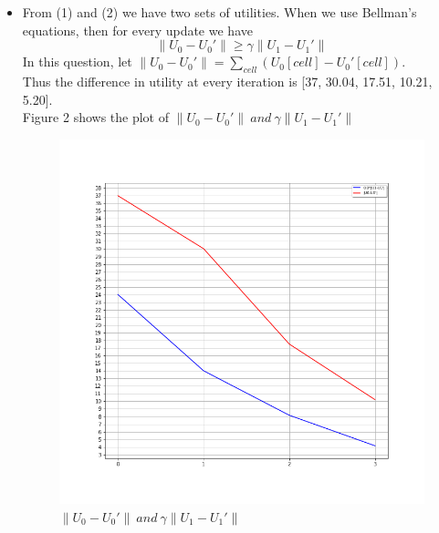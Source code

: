 \documentclass[letter, 10pt]{article}
\begin{document}
\begin{itemize}
\begin{equation*}
\begin{tabular}{ |c|c|c| }
                                    \end{tabular}
                \end{equation*}
                \begin{equation*}
                    Num\_Iterations = 4
                \end{equation*}
    \item[(3)] From (1) and (2) we have two sets of utilities. When we use Bellman's equations, then for every update we have
    \begin{equation}
        \left\|U_0-U_0'\right\|\geq\gamma\left\|U_1-U_1'\right\|
    \end{equation}
    In this question, let $\left\|U_0-U_0'\right\| = \sum_{cell}(U_0[cell]-U_0'[cell])$.\\
    Thus the difference in utility at every iteration is [37, 30.04, 17.51, 10.21, 5.20].\\
    Figure 2 shows the plot of $\left\|U_0-U_0'\right\|\ and \ \gamma\left\|U_1-U_1'\right\|$
    \begin{figure}[H]
        \centering
        \includegraphics[width=\textwidth, height=\textwidth]{HW4/P3.png}
        \caption{$\left\|U_0-U_0'\right\|\ and \ \gamma\left\|U_1-U_1'\right\|$}
    \end{figure}
\end{itemize}
\newpage
\end{document}
